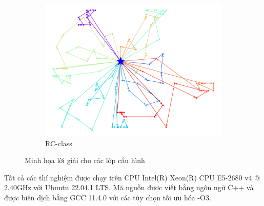 \begin{figure}[H]
\begin{subfigure}{.3\textwidth}
    \includegraphics[width=1\linewidth]{figures/routes_rc101.png}
    \caption{RC-class}
    \label{fig:route_rc}
  \end{subfigure}
  \caption{Minh họa lời giải cho các lớp cấu hình}
\end{figure}

Tất cả các thí nghiệm được chạy trên CPU Intel(R) Xeon(R) CPU E5-2680 v4 @ 2.40GHz với Ubuntu 22.04.1 LTS. Mã nguồn được viết bằng ngôn ngữ C++ và được biên dịch bằng GCC 11.4.0 với các tùy chọn tối ưu hóa -O3.


